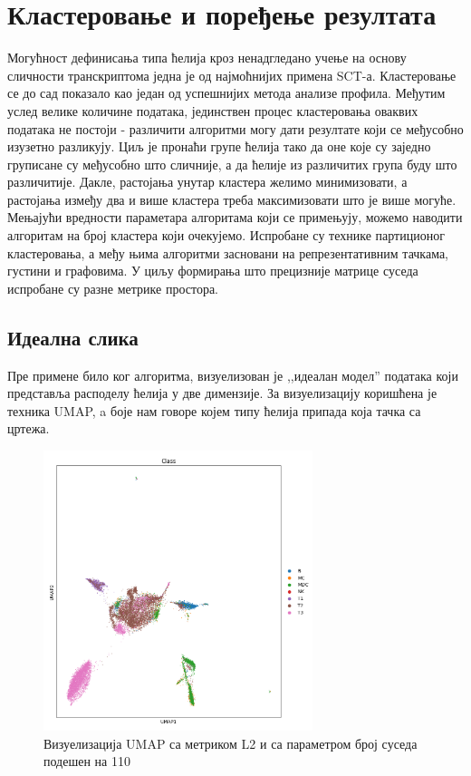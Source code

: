 \documentclass[10pt, a4paper]{article}
\begin{document}
\section{Кластеровање и поређење резултата}
\label{sec: naslov3}
Могућност дефинисања типа ћелија кроз ненадгледано учење на основу сличности транскриптома једна је од најмоћнијих примена SCT-а. \cite{spektralno1} Кластеровање се до сад показало као један од успешнијих метода анализе профила. Међутим услед велике количине података, јединствен процес кластеровања оваквих података не постоји - различити алгоритми могу дати резултате који се међусобно изузетно разликују. Циљ је пронаћи групе ћелија тако да оне које су заједно груписане су међусобно што сличније, а да ћелије из различитих група буду што различитије. Дакле, растојања унутар кластера желимо минимизовати, а растојања између два и више кластера треба максимизовати што је више могуће.
Мењајући вредности параметара алгоритама који се примењују, можемо наводити алгоритам на број кластера који очекујемо. Испробане су технике партиционог кластеровања, а међу њима алгоритми засновани на репрезентативним тачкама, густини и графовима. У циљу формирања што прецизније матрице суседа испробане су разне метрике простора.

\subsection{Идеална слика}
\label{subsec: podnaslov4}
Пре примене било ког алгоритма, визуелизован је ,,идеалан модел'' података који представља расподелу ћелија у две димензије. За визуелизацију коришћена је техника UMAP, a боје нам говоре којем типу ћелија припада која тачка са цртежа.

\begin{figure}[h]
    \centering
    \captionsetup{justification=centering}
    \includegraphics[width=0.7\textwidth]{umap1.png}
    \caption{Визуелизација UMAP са метриком L2 и са параметром број суседа подешен на 110}
    \label{fig:gustina2}
\end{figure}
\end{document}
